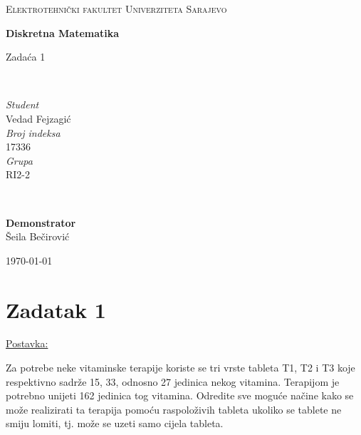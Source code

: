 \documentclass[12pt]{article}
\begin{document}
\begin{titlepage}
	\newcommand{\HRule}{\rule{\linewidth}{0.5mm}}
	
	\center
	
	\textsc{\Large Elektrotehnički fakultet Univerziteta Sarajevo}\\[4cm]
	
	{\huge\bfseries Diskretna Matematika\vspace{5mm}

 	Zadaća 1}\\[4.5cm]

	\begin{minipage}{0.4\textwidth}
		\begin{flushleft}
			\large
			\textit{Student}\\
			Vedad Fejzagić\\[5mm]
			\textit{Broj indeksa}\\
			17336\\[5mm]
			\textit{Grupa}\\
			RI2-2
		\end{flushleft}
	\end{minipage}
	~
	\begin{minipage}{0.4\textwidth}
		\begin{flushright}
			\large
			\textbf{Demonstrator}\\
			\hspace{10mm}Šeila Bečirović
		\end{flushright}
	\end{minipage}
	
	\vfill\vfill\vfill
	
	{\large\today}
	
	\vfill
	
\end{titlepage}


\newpage

\section*{Zadatak 1\label{Z1}}

\underline{Postavka:}

Za potrebe neke vitaminske terapije koriste se tri vrste tableta T1, T2 i T3 koje respektivno sadrže 15, 33, odnosno 27 jedinica nekog vitamina. Terapijom je potrebno unijeti 162 jedinica tog vitamina. Odredite sve moguće načine kako se može realizirati ta terapija pomoću raspoloživih tableta ukoliko se tablete ne smiju lomiti, tj. može se uzeti samo cijela tableta.
\end{document}
